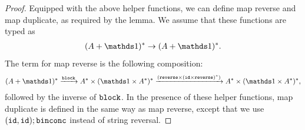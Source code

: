 \begin{proof}
    Equipped with the above helper functions, we can define map reverse and map duplicate, as required by the lemma.
    We assume that these functions are typed as 
    \begin{align*}
    (A + \onetype)^* \to (A + \onetype)^*.
    \end{align*}
    The term for map reverse is the following composition:
    \begin{align*}
    (A + \onetype)^* \xrightarrow{\blockterm} A^* \times (\onetype \times A^*)^* \xrightarrow{(\reverseterm \times (\idterm \times \reverseterm)^*)} A^* \times (\onetype \times A^*)^*,
    \end{align*}
    followed by the inverse of $\mathtt{block}$. In the presence of these helper functions, map duplicate is defined in the same way as map reverse, except that we use $(\mathtt{id},\mathtt{id});\mathtt{binconc}$ instead of string reversal.
\end{proof}

